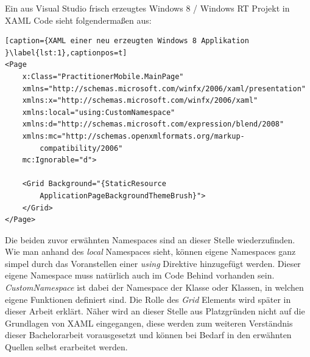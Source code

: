 \documentclass[a4paper,bibtotoc,oneside]{scrbook}
\begin{document}
\newline
\newline
Ein aus Visual Studio frisch erzeugtes Windows 8 / Windows RT Projekt in XAML Code sieht folgendermaßen aus:
\begin{lstlisting}[caption={XAML einer neu erzeugten Windows 8 Applikation }\label{lst:1},captionpos=t]
<Page
    x:Class="PractitionerMobile.MainPage"
    xmlns="http://schemas.microsoft.com/winfx/2006/xaml/presentation"
    xmlns:x="http://schemas.microsoft.com/winfx/2006/xaml"
    xmlns:local="using:CustomNamespace"
    xmlns:d="http://schemas.microsoft.com/expression/blend/2008"
    xmlns:mc="http://schemas.openxmlformats.org/markup-
		compatibility/2006"
    mc:Ignorable="d">

    <Grid Background="{StaticResource 
		ApplicationPageBackgroundThemeBrush}">
    </Grid>
</Page>

\end{lstlisting}
Die beiden zuvor erwähnten Namespaces sind an dieser Stelle wiederzufinden.
\newline
Wie man anhand des \textit{local} Namespaces sieht, können eigene Namespaces ganz simpel durch das Voranstellen einer \textit{using} Direktive hinzugefügt werden. Dieser eigene Namespace muss natürlich auch im Code Behind vorhanden sein.
\newline
\textit{CustomNamespace} ist dabei der Namespace der Klasse oder Klassen, in welchen eigene Funktionen definiert sind. Die Rolle des \textit{Grid} Elements wird später in dieser Arbeit erklärt.
\newline
\newline
Näher wird an dieser Stelle aus Platzgründen nicht auf die Grundlagen von XAML eingegangen, diese werden zum weiteren Verständnis dieser Bachelorarbeit vorausgesetzt und können bei Bedarf in den erwähnten Quellen selbst erarbeitet werden.
\end{document}
